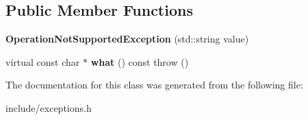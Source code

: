 \subsection*{Public Member Functions}
\begin{DoxyCompactItemize}
\item 
\hypertarget{class_operation_not_supported_exception_ab6f7474f05c4b91ac0f31c9e852bfedb}{{\bfseries Operation\+Not\+Supported\+Exception} (std\+::string value)}\label{class_operation_not_supported_exception_ab6f7474f05c4b91ac0f31c9e852bfedb}

\item 
\hypertarget{class_operation_not_supported_exception_ab6533734842e249902213a809a4d3f78}{virtual const char $\ast$ {\bfseries what} () const   throw ()}\label{class_operation_not_supported_exception_ab6533734842e249902213a809a4d3f78}

\end{DoxyCompactItemize}


The documentation for this class was generated from the following file\+:\begin{DoxyCompactItemize}
\item 
include/exceptions.\+h\end{DoxyCompactItemize}
